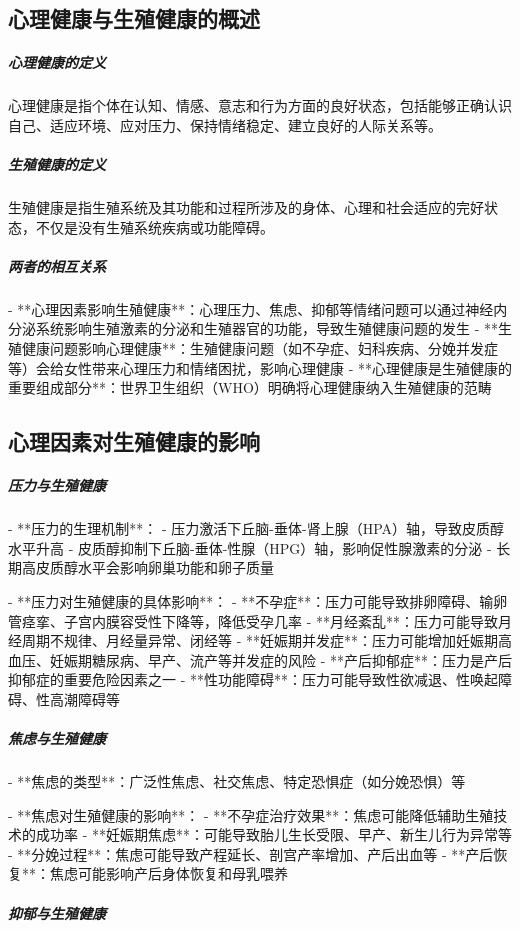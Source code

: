 \begin{enumerate}
\subsection{心理健康与生殖健康的概述}

\subparagraph{心理健康的定义}
心理健康是指个体在认知、情感、意志和行为方面的良好状态，包括能够正确认识自己、适应环境、应对压力、保持情绪稳定、建立良好的人际关系等。

\subparagraph{生殖健康的定义}
生殖健康是指生殖系统及其功能和过程所涉及的身体、心理和社会适应的完好状态，不仅是没有生殖系统疾病或功能障碍。

\subparagraph{两者的相互关系}

- **心理因素影响生殖健康**：心理压力、焦虑、抑郁等情绪问题可以通过神经内分泌系统影响生殖激素的分泌和生殖器官的功能，导致生殖健康问题的发生
- **生殖健康问题影响心理健康**：生殖健康问题（如不孕症、妇科疾病、分娩并发症等）会给女性带来心理压力和情绪困扰，影响心理健康
- **心理健康是生殖健康的重要组成部分**：世界卫生组织（WHO）明确将心理健康纳入生殖健康的范畴

\subsection{心理因素对生殖健康的影响}

\subparagraph{压力与生殖健康}

- **压力的生理机制**：
  - 压力激活下丘脑-垂体-肾上腺（HPA）轴，导致皮质醇水平升高
  - 皮质醇抑制下丘脑-垂体-性腺（HPG）轴，影响促性腺激素的分泌
  - 长期高皮质醇水平会影响卵巢功能和卵子质量

- **压力对生殖健康的具体影响**：
  - **不孕症**：压力可能导致排卵障碍、输卵管痉挛、子宫内膜容受性下降等，降低受孕几率
  - **月经紊乱**：压力可能导致月经周期不规律、月经量异常、闭经等
  - **妊娠期并发症**：压力可能增加妊娠期高血压、妊娠期糖尿病、早产、流产等并发症的风险
  - **产后抑郁症**：压力是产后抑郁症的重要危险因素之一
  - **性功能障碍**：压力可能导致性欲减退、性唤起障碍、性高潮障碍等

\subparagraph{焦虑与生殖健康}

- **焦虑的类型**：广泛性焦虑、社交焦虑、特定恐惧症（如分娩恐惧）等

- **焦虑对生殖健康的影响**：
  - **不孕症治疗效果**：焦虑可能降低辅助生殖技术的成功率
  - **妊娠期焦虑**：可能导致胎儿生长受限、早产、新生儿行为异常等
  - **分娩过程**：焦虑可能导致产程延长、剖宫产率增加、产后出血等
  - **产后恢复**：焦虑可能影响产后身体恢复和母乳喂养

\subparagraph{抑郁与生殖健康}


\end{enumerate}
